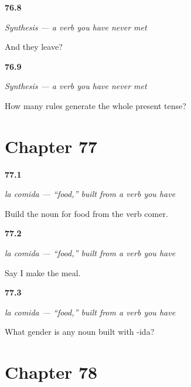\noindent\begin{minipage}[t]{\linewidth}
\raggedright
\hypertarget{review-ES-C13-sintesis-derivar-they}{\textbf{76.8}} \emph{Synthesis — a verb you have never met}\par
\small And they leave?
\end{minipage}\par\medskip

\noindent\begin{minipage}[t]{\linewidth}
\raggedright
\hypertarget{review-ES-C13-sintesis-derivar-rules}{\textbf{76.9}} \emph{Synthesis — a verb you have never met}\par
\small How many rules generate the whole present tense?
\end{minipage}\par\medskip

\section*{Chapter 77}

\noindent\begin{minipage}[t]{\linewidth}
\raggedright
\hypertarget{review-ES-C43-comida-build}{\textbf{77.1}} \emph{la comida — \textquotedblleft{}food,\textquotedblright{} built from a verb you have}\par
\small Build the noun for food from the verb comer.
\end{minipage}\par\medskip

\noindent\begin{minipage}[t]{\linewidth}
\raggedright
\hypertarget{review-ES-C43-comida-make}{\textbf{77.2}} \emph{la comida — \textquotedblleft{}food,\textquotedblright{} built from a verb you have}\par
\small Say I make the meal.
\end{minipage}\par\medskip

\noindent\begin{minipage}[t]{\linewidth}
\raggedright
\hypertarget{review-ES-C43-comida-gender}{\textbf{77.3}} \emph{la comida — \textquotedblleft{}food,\textquotedblright{} built from a verb you have}\par
\small What gender is any noun built with -ida?
\end{minipage}\par\medskip

\section*{Chapter 78}

